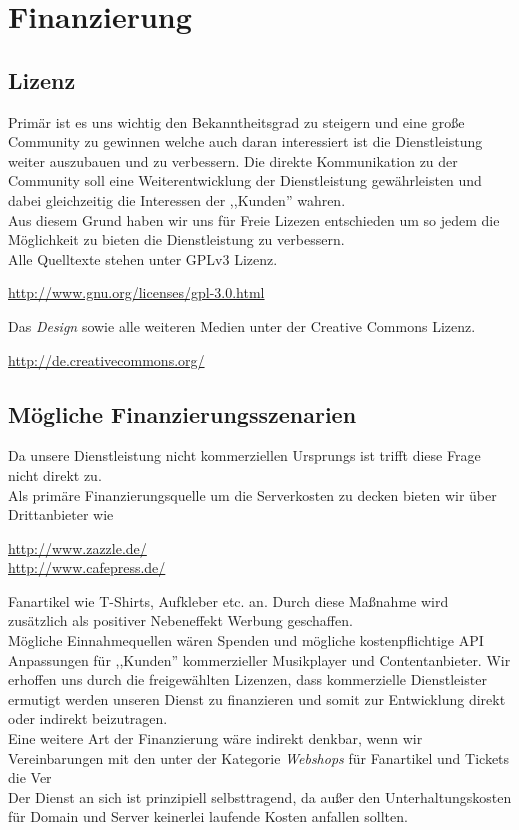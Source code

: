 \chapter{Finanzierung}

\section{Lizenz}
Primär ist es uns wichtig den Bekanntheitsgrad zu steigern und eine große
Community zu gewinnen welche auch daran interessiert ist die Dienstleistung
weiter auszubauen und zu verbessern. Die direkte Kommunikation zu der Community
soll eine Weiterentwicklung der Dienstleistung gewährleisten und dabei
gleichzeitig die Interessen der ,,Kunden'' wahren.
\\
Aus diesem Grund haben wir uns für Freie Lizezen entschieden um so jedem die
Möglichkeit zu bieten die Dienstleistung zu verbessern.
\\
Alle Quelltexte stehen unter GPLv3 Lizenz.
\begin{center}
\url{http://www.gnu.org/licenses/gpl-3.0.html}
\end{center}
Das \emph{Design} sowie alle weiteren
Medien unter der Creative Commons Lizenz.
\begin{center}
\url{http://de.creativecommons.org/ }
\end{center}

\section{Mögliche Finanzierungsszenarien}
Da unsere Dienstleistung nicht kommerziellen Ursprungs ist trifft diese Frage
nicht direkt zu.
\\
Als primäre Finanzierungsquelle um die Serverkosten zu decken bieten wir über
Drittanbieter wie 
\begin{center}
 \url{http://www.zazzle.de/} 
 \\
 \url{http://www.cafepress.de/}
\end{center}
Fanartikel wie T-Shirts, Aufkleber etc. an. Durch diese Maßnahme wird zusätzlich
als positiver Nebeneffekt Werbung geschaffen.
\\
Mögliche Einnahmequellen wären Spenden und mögliche kostenpflichtige API
Anpassungen für ,,Kunden'' kommerzieller Musikplayer und Contentanbieter. Wir
erhoffen uns durch die freigewählten Lizenzen, dass kommerzielle Dienstleister
ermutigt werden unseren Dienst zu finanzieren und somit zur Entwicklung direkt
oder indirekt beizutragen.
\\
Eine weitere Art der Finanzierung wäre indirekt denkbar, wenn wir Vereinbarungen
mit den unter der Kategorie \emph{Webshops} für Fanartikel und Tickets die Ver
\\
Der Dienst an sich ist prinzipiell selbsttragend, da außer den
Unterhaltungskosten für Domain und Server keinerlei laufende Kosten anfallen sollten.
